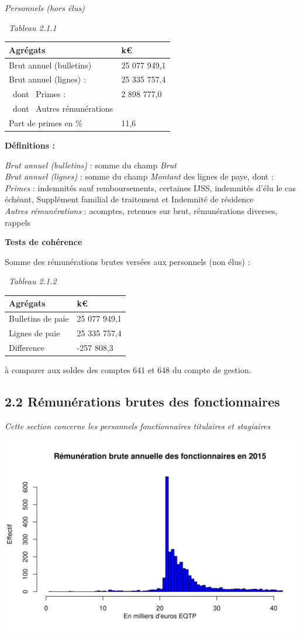 \emph{Personnels (hors élus)}

~\emph{Tableau 2.1.1}

\begin{longtable}[]{@{}ll@{}}
\toprule
Agrégats & k€\tabularnewline
\midrule
\endhead
Brut annuel (bulletins) & 25 077 949,1\tabularnewline
Brut annuel (lignes) : & 25 335 757,4\tabularnewline
~dont ~Primes : & 2 898 777,0\tabularnewline
~dont ~Autres rémunérations &\tabularnewline
Part de primes en \% & 11,6\tabularnewline
\bottomrule
\end{longtable}

\textbf{Définitions :}

\emph{Brut annuel (bulletins)} : somme du champ \emph{Brut}\\
\emph{Brut annuel (lignes)} : somme du champ \emph{Montant} des lignes
de paye, dont :\\
\emph{Primes} : indemnités sauf remboursements, certaines IJSS,
indemnités d'élu le cas échéant, Supplément familial de traitement et
Indemnité de résidence\\
\emph{Autres rémunérations} : acomptes, retenues sur brut, rémunérations
diverses, rappels

\textbf{Tests de cohérence}

Somme des rémunérations brutes versées aux personnels (non élus) :

~\emph{Tableau 2.1.2}

\begin{longtable}[]{@{}ll@{}}
\toprule
Agrégats & k€\tabularnewline
\midrule
\endhead
Bulletins de paie & 25 077 949,1\tabularnewline
Lignes de paie & 25 335 757,4\tabularnewline
Difference & -257 808,3\tabularnewline
\bottomrule
\end{longtable}

à comparer aux soldes des comptes 641 et 648 du compte de gestion.

\hypertarget{remunerations-brutes-des-fonctionnaires}{%
\subsection{2.2 Rémunérations brutes des
fonctionnaires}\label{remunerations-brutes-des-fonctionnaires}}

\emph{Cette section concerne les personnels fonctionnaires titulaires et
stagiaires}

\includegraphics{altair_files/figure-latex/unnamed-chunk-43-1.png}

